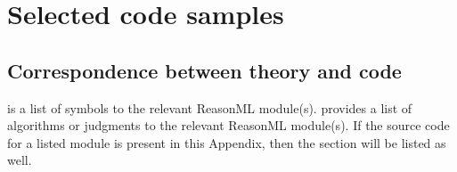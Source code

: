 \chapter{Selected code samples}
\label{app:code-samples}

\newcommand{\cb}[1]{
  \begin{singlespace}
    \inputminted[fontsize=\footnotesize,frame=single]{reasonml}{code/#1}
  \end{singlespace}
  \captionof{listing}{\texttt{#1}}
}

\section{Correspondence between theory and code}
\label{sec:correspondence}

 is a list of symbols to the relevant ReasonML module(s).  provides a list of algorithms or judgments to the relevant ReasonML module(s). If the source code for a listed module is present in this Appendix, then the section will be listed as well.

\begin{table}
  \centering
  \caption{Correspondence between symbols and code}
  \label{tab:correspondence-theory-code}
\end{table}

